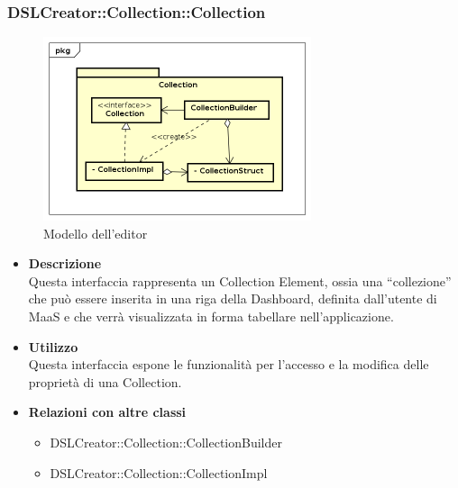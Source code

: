  \subsubsection{DSLCreator::Collection::Collection}
 \begin{figure}[H]
   \centering
   \includegraphics[width=0.7\textwidth]{res/img/Collection.png}
   \caption{Modello dell'editor}
   \label{fig:diagram_model}
 \end{figure}
                    \begin{itemize}
                        \item \textbf{Descrizione} \hfill \\
                            Questa interfaccia rappresenta un Collection Element, ossia una ``collezione'' che può essere inserita in una riga della Dashboard, definita dall'utente di MaaS e che verrà visualizzata in forma tabellare nell'applicazione.
                        \item \textbf{Utilizzo} \hfill \\
                            Questa interfaccia espone le funzionalità per l'accesso e la modifica delle proprietà di una Collection.
                        \item \textbf{Relazioni con altre classi}
                            \begin{itemize}
                              \item DSLCreator::Collection::CollectionBuilder
                              \item DSLCreator::Collection::CollectionImpl
                            \end{itemize}
                    \end{itemize}

